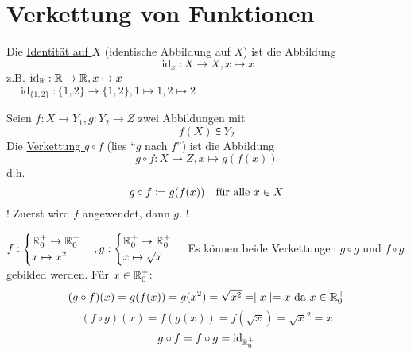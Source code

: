 \documentclass{gadsescript}
\begin{document}
\section{Verkettung von Funktionen}
\begin{definition}
	Die \underline{Identität auf $ X $} (identische Abbildung auf $ X $) ist die Abbildung
	\[ \operatorname{id}_x : X \to X, x \mapsto x \]
	z.B. $ \operatorname{id}_{\mathbb{R}} : \mathbb{R} \to \mathbb{R}, x \mapsto x $\\
	$ \quad \operatorname{id}_{\{1, 2\}} : \{ 1, 2 \} \to \{ 1, 2 \}, 1 \mapsto 1, 2 \mapsto 2 $
\end{definition}

\begin{definition}
	Seien $ f : X \to Y_1, g : Y_2 \to Z $ zwei Abbildungen mit 
	\[ f(X) \subseteqq Y_2 \]
	Die \underline{Verkettung $ g \circ f $} (lies ``$ g $ nach $ f $'') ist die Abbildung
	\[ g \circ f : X \to Z, x \mapsto g(f(x)) \]
	d.h.
	\[ g \circ f \coloneqq g(f(x)) \quad \text{für alle $ x \in X $} \]
	! Zuerst wird $ f $ angewendet, dann $ g $. !
\end{definition}

\begin{example}
	$ f :
	\begin{cases}
		\mathbb{R}_{0}^{+} \to \mathbb{R}_{0}^{+}\\
		x \mapsto x^2
	\end{cases},
	g :
	\begin{cases}
		\mathbb{R}_{0}^{+} \to \mathbb{R}_{0}^{+}\\
		x \mapsto \sqrt{x}
	\end{cases} $
	Es können beide Verkettungen $ g \circ g $ und $ f \circ g $ gebilded werden. Für $ x \in \mathbb{R}_{0}^{+} $:
	\[ ( g \circ f )(x) = g(f(x)) = g(x^2) = \sqrt{x^2} = \mid x \mid = x \text{ da $ x \in \mathbb{R}_{0}^{+} $} \]
	\[ ( f \circ g )(x) = f(g(x)) = f(\sqrt{x}) = \sqrt{x}^2 = x \]
	\[ g \circ f = f \circ g = \operatorname{id}_{\mathbb{R}_0^+} \]
\end{example}
\end{document}
